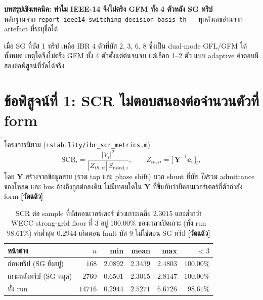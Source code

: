 \documentclass[11pt,a4paper]{article}
\newcommand{\code}[1]{\texttt{\small #1}}
\newcommand{\mes}{\textcolor{ok}{\textbf{[วัดแล้ว]}}}
\begin{document}
\begin{center}
{\large\bfseries\color{navy} บทสรุปเชิงเทคนิค: ทำไม IEEE-14 จึงไม่ตรึง GFM ทั้ง 4 ตัวหลัง SG ทริป}\\[2pt]
{\small\color{gray} หลักฐานจาก \code{report\_ieee14\_switching\_decision\_basis\_th} — ทุกตัวเลขอ่านจาก artefact ที่ระบุชื่อได้}
\end{center}

\vspace{-4pt}
\noindent
เมื่อ SG ที่บัส 1 ทริป เหลือ IBR 4 ตัวที่บัส 2, 3, 6, 8 ซึ่งเป็น dual-mode
GFL/GFM ได้ทั้งหมด เหตุใดจึงไม่ตรึง GFM ทั้ง 4 ตัวตั้งแต่ต้นจนจบ แต่เลือก 1--2 ตัว
แบบ adaptive คำตอบมีสองข้อพิสูจน์ที่วัดได้จริง

\section{ข้อพิสูจน์ที่ 1: SCR ไม่ตอบสนองต่อจำนวนตัวที่ form}

\noindent
โครงการนิยาม (\code{+stability/ibr\_scr\_metrics.m})
\begin{equation}
\mathrm{SCR}_i = \frac{|V_i|^2}{|Z_{th,ii}|\,S_{\mathrm{rated},i}},
\qquad
Z_{th,ii} = \bigl[\,\mathbf{Y}^{-1}\mathbf{e}_i\,\bigr]_i ,
\label{eq:scr}
\end{equation}
โดย $\mathbf{Y}$ สร้างจากข้อมูลสาย (รวม tap และ phase shift) บวก shunt ที่บัส
\emph{ไม่}รวม admittance ของโหลด และ bus อ้างอิงถูกต่อลงดิน ไม่มีเทอมใดใน
$\mathbf{Y}$ ที่ขึ้นกับว่ามีคอนเวอร์เตอร์กี่ตัวกำลัง form \mes

\begin{table}[H]
\centering\small
\begin{tabular}{@{}lrrrrr@{}}
\toprule
\textbf{หน้าต่าง} & $n$ & \textbf{min} & \textbf{mean} & \textbf{max} & \textbf{$<3$}\\
\midrule
ก่อนทริป (SG ยังอยู่)   & $168$   & $2.0892$ & $2.3439$ & $2.4803$ & $100.00\%$\\
เกาะหลังทริป (SG หลุด) & $2760$  & $0.6501$ & $\mathbf{2.3015}$ & $2.8147$ & $\mathbf{100.00\%}$\\
ทั้ง run               & $14716$ & $0.2944$ & $2.5271$ & $6.6726$ & $\mathbf{98.61\%}$\\
\bottomrule
\end{tabular}
\caption{SCR ต่อ sample ที่บัสคอนเวอร์เตอร์ ช่วงเกาะเฉลี่ย $2.3015$ และต่ำกว่า
WECC strong-grid floor ที่ $3$ อยู่ $100.00\%$ ของเวลาเปิดเกาะ (ทั้ง run $98.61\%$)
ค่าต่ำสุด $0.2944$ เกิดตอน fault บัส 9 ไม่ใช่ตอน SG ทริป \mes}
\end{table}
\end{document}
